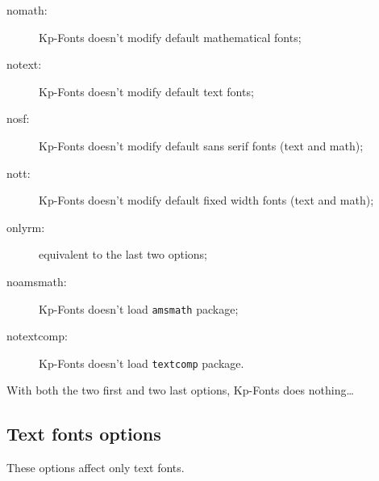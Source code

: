 \documentclass[a4paper,11pt]{article}
\begin{document}
\begin{description}
	\item[nomath:] Kp-Fonts doesn't modify default mathematical fonts;
	\item[notext:] Kp-Fonts doesn't modify default text fonts;
	\item[nosf:] Kp-Fonts doesn't modify default sans serif fonts (text and math);
	\item[nott:] Kp-Fonts doesn't modify default fixed width fonts (text and math);
	\item[onlyrm:] equivalent to the last two options;
	\item[noamsmath:] Kp-Fonts doesn't load \texttt{amsmath} package; 
	\item[notextcomp:] Kp-Fonts doesn't load \texttt{textcomp} package.
\end{description}

With both the two first and two last options, Kp-Fonts does nothing\dots


\subsection{Text fonts options}

These options affect only text fonts.
\end{document}
